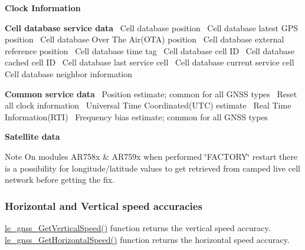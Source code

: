\begin{DoxyItemize}
\item {\bfseries Clock Information}~\newline

\item {\bfseries Cell database service data}~\newline
 Cell database position~\newline
 Cell database latest G\+PS position~\newline
 Cell database Over The Air(\+O\+T\+A) position~\newline
 Cell database external reference position~\newline
 Cell database time tag~\newline
 Cell database cell ID~\newline
 Cell database cached cell ID~\newline
 Cell database last service cell~\newline
 Cell database current service cell~\newline
 Cell database neighbor information~\newline

\item {\bfseries Common service data}~\newline
 Position estimate; common for all G\+N\+SS types~\newline
 Reset all clock information~\newline
 Universal Time Coordinated(\+U\+T\+C) estimate~\newline
 Real Time Information(\+R\+T\+I)~\newline
 Frequency bias estimate; common for all G\+N\+SS types~\newline

\item {\bfseries Satellite data}~\newline

\end{DoxyItemize}

\begin{DoxyNote}{Note}
On modules A\+R758x \& A\+R759x when performed \char`\"{}\+F\+A\+C\+T\+O\+R\+Y\char`\"{} restart there is a possibility for longitude/latitude values to get retrieved from camped live cell network before getting the fix.
\end{DoxyNote}
\hypertarget{platformConstraintsGnss_platformConstraintsGnss_speedAccuracies}{}\subsubsection{Horizontal and Vertical speed accuracies}\label{platformConstraintsGnss_platformConstraintsGnss_speedAccuracies}
{\ttfamily \hyperlink{le__gnss__interface_8h_a37a370cec19610be1f99d9c9db291a1e}{le\+\_\+gnss\+\_\+\+Get\+Vertical\+Speed()}} function returns the vertical speed accuracy. {\ttfamily \hyperlink{le__gnss__interface_8h_a483fba8fc6b0fa116bcbd889af95fc4f}{le\+\_\+gnss\+\_\+\+Get\+Horizontal\+Speed()}} function returns the horizontal speed accuracy.

